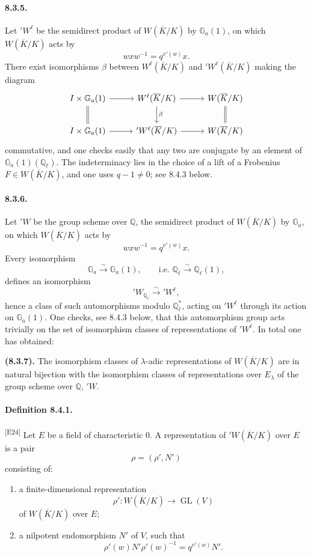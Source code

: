 \documentclass[10pt,letterpaper]{article}
\newcommand{\GL}{\operatorname{GL}}
\newcommand{\iso}{\xrightarrow{\sim}}
\providecommand{\GL}{\operatorname{GL}}
\providecommand{\GL}{\operatorname{GL}}
\newcommand{\auditmark}[1]{\textsuperscript{\normalfont\scriptsize[E#1]}}
\begin{document}
\paragraph{8.3.5.} Let \({}'W^\ell\) be the semidirect product of \(W(\overline K/K)\) by \(\mathbb G_a(1)\), on which \(W(\overline K/K)\) acts by
\[
w x w^{-1}=q^{v'(w)}x.
\]
There exist isomorphisms \(\beta\) between \(W^\ell(\overline K/K)\) and \({}'W^\ell(\overline K/K)\) making the diagram
\[
\begin{tikzcd}[column sep=2.8em,row sep=2.0em]
I\times\mathbb G_a(1)\arrow[r]\arrow[d,equal]&
W^\ell(\overline K/K)\arrow[r]\arrow[d,"\beta"]&
W(\overline K/K)\arrow[d,equal]\\
I\times\mathbb G_a(1)\arrow[r]&
{}'W^\ell(\overline K/K)\arrow[r]&
W(\overline K/K)
\end{tikzcd}
\]
commutative, and one checks easily that any two are conjugate by an element of \(\mathbb G_a(1)(\mathbb Q_\ell)\). The indeterminacy lies in the choice of a lift of a Frobenius \(F\in W(\overline K/K)\), and one uses \(q-1\ne0\); see 8.4.3 below.

\paragraph{8.3.6.} Let \({}'W\) be the group scheme over \(\mathbb Q\), the semidirect product of \(W(\overline K/K)\) by \(\mathbb G_a\), on which \(W(\overline K/K)\) acts by
\[
w x w^{-1}=q^{v'(w)}x.
\]
Every isomorphism
\[
\mathbb G_a\iso\mathbb G_a(1),
\qquad\text{i.e. }\mathbb Q_\ell\iso\mathbb Q_\ell(1),
\]
defines an isomorphism
\[
{}'W_{\mathbb Q_\ell}\iso{}'W^\ell,
\]
hence a class of such automorphisms modulo \(\mathbb Q_\ell^*\), acting on \({}'W^\ell\) through its action on \(\mathbb G_a(1)\). One checks, see 8.4.3 below, that this automorphism group acts trivially on the set of isomorphism classes of representations of \({}'W^\ell\). In total one has obtained:

\noindent\textbf{(8.3.7).} The isomorphism classes of \(\lambda\)-adic representations of \(W(\overline K/K)\) are in natural bijection with the isomorphism classes of representations over \(E_\lambda\) of the group scheme over \(\mathbb Q\), \({}'W\).

\paragraph{Definition 8.4.1.}\auditmark{24} Let \(E\) be a field of characteristic \(0\). A representation of \({}'W(\overline K/K)\) over \(E\) is a pair
\[
\rho=(\rho',N')
\]
consisting of:
\begin{enumerate}[label=(\alph*)]
\item a finite-dimensional representation
\[
\rho':W(\overline K/K)\longrightarrow \GL(V)
\]
of \(W(\overline K/K)\) over \(E\);
\item a nilpotent endomorphism \(N'\) of \(V\), such that
\[
\tag{8.4.1.1}
\rho'(w)N'\rho'(w)^{-1}=q^{v'(w)}N'.
\]
\end{enumerate}
\end{document}
